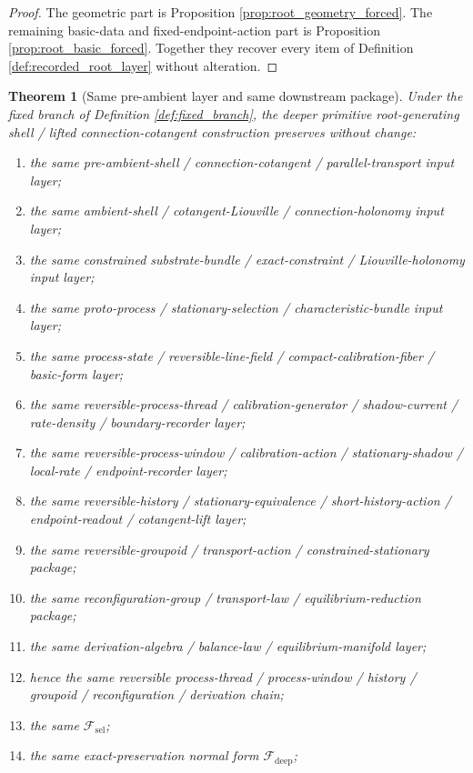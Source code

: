 \documentclass[11pt]{article}
\newcommand{\DeepFunctional}{\mathscr F_{\mathrm{deep}}}
\newcommand{\StemFunctional}{\mathscr F_{\mathrm{sel}}}
\newtheorem{theorem}{Theorem}
\begin{document}
\begin{proof}
The geometric part is Proposition \ref{prop:root_geometry_forced}. The remaining basic-data and fixed-endpoint-action part is Proposition \ref{prop:root_basic_forced}. Together they recover every item of Definition \ref{def:recorded_root_layer} without alteration.
\end{proof}

\begin{theorem}[Same pre-ambient layer and same downstream package]
\label{thm:same_package}
Under the fixed branch of Definition \ref{def:fixed_branch}, the deeper primitive root-generating shell / lifted connection-cotangent construction preserves without change:
\begin{enumerate}
    \item the same pre-ambient-shell / connection-cotangent / parallel-transport input layer;
    \item the same ambient-shell / cotangent-Liouville / connection-holonomy input layer;
    \item the same constrained substrate-bundle / exact-constraint / Liouville-holonomy input layer;
    \item the same proto-process / stationary-selection / characteristic-bundle input layer;
    \item the same process-state / reversible-line-field / compact-calibration-fiber / basic-form layer;
    \item the same reversible-process-thread / calibration-generator / shadow-current / rate-density / boundary-recorder layer;
    \item the same reversible-process-window / calibration-action / stationary-shadow / local-rate / endpoint-recorder layer;
    \item the same reversible-history / stationary-equivalence / short-history-action / endpoint-readout / cotangent-lift layer;
    \item the same reversible-groupoid / transport-action / constrained-stationary package;
    \item the same reconfiguration-group / transport-law / equilibrium-reduction package;
    \item the same derivation-algebra / balance-law / equilibrium-manifold layer;
    \item hence the same reversible process-thread / process-window / history / groupoid / reconfiguration / derivation chain;
    \item the same \(\StemFunctional\);
    \item the same exact-preservation normal form \(\DeepFunctional\);

\end{enumerate}
\end{theorem}
\end{document}
